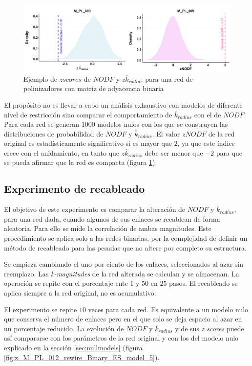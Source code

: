 \begin{figure}[hp!]
\centering
\includegraphics[scale=0.5]{Figures/ESTATICA_zALL.png}
\caption{Ejemplo de $z scores$ de $NODF$ y $z\overline k_{radius}$ para una red de polinizadores con matriz de adyacencia binaria \cite{elberling1999structure} }
\label{fig:ESTATICA_zALL}
\end{figure}

El propósito no es llevar a cabo un análisis exhaustivo con modelos de diferente nivel de restricción sino comparar el comportamiento de $\overline k_{radius}$ con el de $NODF$. Para
cada red se generan $1000$ modelos nulos con los que se construyen las distribuciones de probabilidad de $NODF$ y $\overline k_{radius}$. El valor $zNODF$ de la red original es estadísticamente significativo si es mayor que $2$, ya que este índice crece con el anidamiento, en tanto que $z\overline k_{radius}$ debe ser menor que $-2$ para que se pueda afirmar que la red es compacta (figura \ref{fig:ESTATICA_zALL}).

\subsection{Experimento de recableado}

El objetivo de este experimento es comparar la alteración de $NODF$ y $\overline k_{radius}$, para una red dada, cuando algunos de sus enlaces se recablean de forma aleatoria. Para ello se mide la correlación de ambas magnitudes. Este procedimiento se aplica solo a las redes binarias, por la complejidad de definir un método de recableado para las pesadas que no altere por completo su estructura.

Se empieza cambiando el uno por ciento de los enlaces, seleccionados al azar sin reemplazo. Las \textit{k-magnitudes} de la red alterada se calculan y se almacenan. La operación se repite con el porcentaje ente $1$ y $50$ en $25$ pasos. El recableado se aplica siempre a la red original, no es acumulativo. 

El experimento se repite $10$ veces para cada red. Es equivalente a un modelo nulo que conserva el número de enlaces pero en el que solo se deja espacio al azar en un porcentaje reducido. La evolución de $NODF$ y $\overline k_{radius}$ y de sus \textit{z scores} puede así compararse con los parámetros de la red original y con los del modelo nulo explicado en la sección \ref{sec:nullmodels} (figura \ref{fig:z_M_PL_012_rewire_Binary_ES_model_5}).

